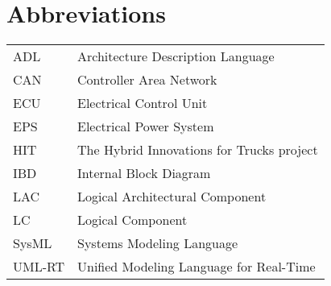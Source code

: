 
\thispagestyle{plain}			%

\section*{Abbreviations}

\begin{table}[H]
\begin{tabular}{ll}
ADL & Architecture Description Language \\
CAN & Controller Area Network \\
ECU & Electrical Control Unit \\
EPS & Electrical Power System \\
HIT & The Hybrid Innovations for Trucks project \\
IBD & Internal Block Diagram \\
LAC & Logical Architectural Component \\
LC & Logical Component \\
SysML & Systems Modeling Language \\
UML-RT &  Unified Modeling Language for Real-Time \\
\end{tabular}
\end{table}

